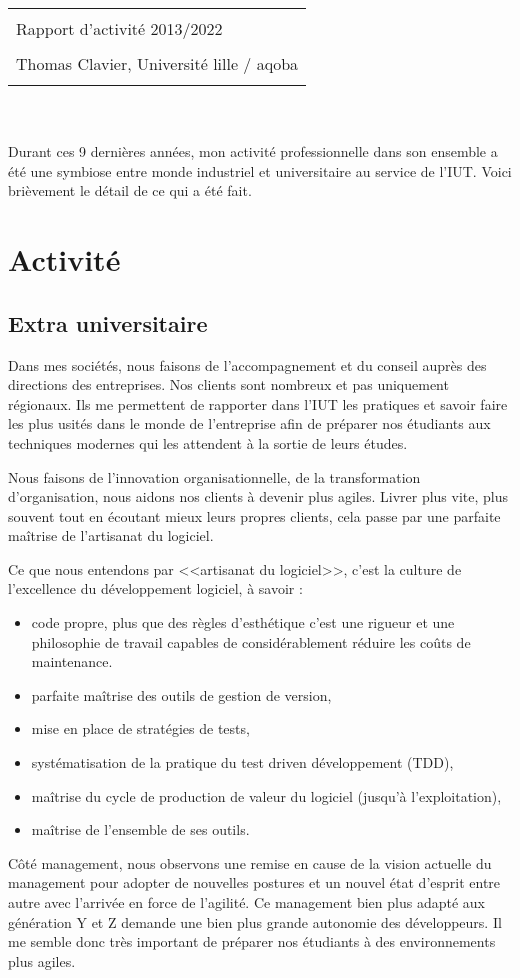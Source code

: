 \documentclass[a4paper]{article}
\title{
  \begin{tabularx}{\linewidth}{l}
    \hline\hline
    \\
    \Huge Rapport d’activité 2013/2022 \\
    \\
    \Large Thomas Clavier, \normalsize Université lille / aqoba \\
    \\
    \hline\hline
  \end{tabularx}
}
\author{}
\date{}
\begin{document}
\maketitle

Durant ces 9 dernières années, mon activité professionnelle dans son ensemble a été une symbiose entre monde industriel et universitaire au service de l'IUT.
Voici brièvement le détail de ce qui a été fait.

\section{Activité}
\subsection{Extra universitaire}
Dans mes sociétés, nous faisons de l'accompagnement et du conseil auprès des directions des entreprises. Nos clients sont nombreux et pas uniquement régionaux. Ils me permettent de rapporter dans l'IUT les pratiques et savoir faire les plus usités dans le monde de l'entreprise afin de préparer nos étudiants aux techniques modernes qui les attendent à la sortie de leurs études.

Nous faisons de l'innovation organisationnelle, de la transformation d'organisation, nous aidons nos clients à devenir plus agiles. Livrer plus vite, plus souvent tout en écoutant mieux leurs propres clients, cela passe par une parfaite maîtrise de l'artisanat du logiciel.

Ce que nous entendons par <<artisanat du logiciel>>, c'est la culture de l'excellence du développement logiciel, à savoir :
\begin{itemize}
  \item code propre, plus que des règles d'esthétique c'est une rigueur et une philosophie de travail capables de considérablement réduire les coûts de maintenance.
  \item parfaite maîtrise des outils de gestion de version,
  \item mise en place de stratégies de tests,
  \item systématisation de la pratique du test driven développement (TDD),
  \item maîtrise du cycle de production de valeur du logiciel (jusqu'à l'exploitation),
  \item maîtrise de l'ensemble de ses outils.
\end{itemize}

Côté management, nous observons une remise en cause de la vision actuelle du management pour adopter de nouvelles postures et un nouvel état d'esprit entre autre avec l'arrivée en force de l'agilité. Ce management bien plus adapté aux génération Y et Z demande une bien plus grande autonomie des développeurs. Il me semble donc très important de préparer nos étudiants à des environnements plus agiles.
\end{document}
